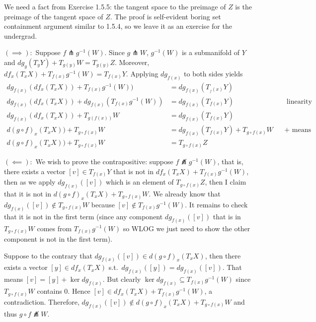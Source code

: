\documentclass[12pt]{article}
\begin{document}
\begin{problem}[7]
We need a fact from Exercise 1.5.5: the tangent space to the preimage of $ Z$ is the preimage of the tangent space of  $ Z$. The proof is self-evident boring set containment argument similar to 1.5.4, so we leave it as an exercise for the undergrad.

$ (\implies):$ Suppose $ f \pitchfork g^{-1}(W)$. Since $ g \pitchfork W$, $ g^{-1}(W)$ is a submanifold of $ Y$ and $ dg_{y}(T_y Y) + T_{g(y)} W = T_{g(y)} Z $. Moreover, $df_x (T_x X) + T_{f(x)}  g^{-1}(W) = T_{f(x)} Y$. Applying $ dg_{f(x)}$ to both sides yields
\begin{align*}
	dg_{f(x)} (df_x (T_x X)) + T_{f(x)} g^{-1}(W)) &= dg_{f(x)} (T_{_f(x)} Y) \\
	dg_{f(x)} (df_x (T_x X)) + dg_{f(x)} (T_{f(x)} g^{-1}(W)) &= dg_{f(x)} (T_{f(x)} Y) && \text{ linearity} \\
	dg_{f(x)} (df_x (T_x X)) + T_{g(f(x))} W &= dg_{f(x)} (T_{f(x)}Y)\\
	d(g \circ f)_x (T_x X)) + T_{g \circ f(x)} W &= dg_{f(x)} (T_{f(x)}Y) + T_{g \circ f(x)} W && + \text{ means span} \\
	d(g \circ f)_x (T_x X)) + T_{g \circ f(x)} W &= T_{g \circ f(x)} Z 
\end{align*}

$ (\impliedby):$ We wish to prove the contrapositive: suppose $ f \not \pitchfork g^{-1}(W)$, that is, there exists a vector $ [v] \in T_{f(x)}Y$ that is not in $ df_x(T_x X) + T_{f(x)}g^{-1}(W)$, then as we apply $ dg_{f(x)} ([v])$ which is an element of $ T_{g \circ f(x)}Z$, then I claim that it is not in $ d(g \circ f)_x (T_x X) + T_{g \circ f(x)} W$. We already know that $ dg_{f(x)}([v]) \not\in T_{g \circ f(x)} W$ because $[v] \not\in T_{f(x)} g^{-1}(W)$. It remains to check that it is not in the first term (since any component $dg_{f(x)} ([v])$ that is in  $ T_{g \circ f(x)}W$ comes from $ T_{f(x)}g^{-1}(W)$ so WLOG we just need to show the other component is not in the first term).

Suppose to the contrary that $ dg_{f(x)}([v]) \in d(g \circ f)_x(T_x X)$, then there exists a vector $ [y] \in df_x(T_x X)$ s.t.\ $ dg_{f(x)}([y]) = dg_{f(x)} ([v])$. That means $ [v] = [y]+ \ker dg_{f(x)}$. But clearly $ \ker dg_{f(x)} \subseteq T_{f(x)}g^{-1}(W)$ since $ T_{g \circ f(x)}W$ contains 0. Hence $ [v] \in df_x(T_x X) + T_{f(x)}g^{-1}(W)$, a contradiction. Therefore, $ dg_{f(x)}([v]) \not\in d(g \circ f)_x (T_x X) + T_{g \circ f(x)}W$ and thus $ g \circ f \not \pitchfork W$.
\end{problem}
\end{document}
